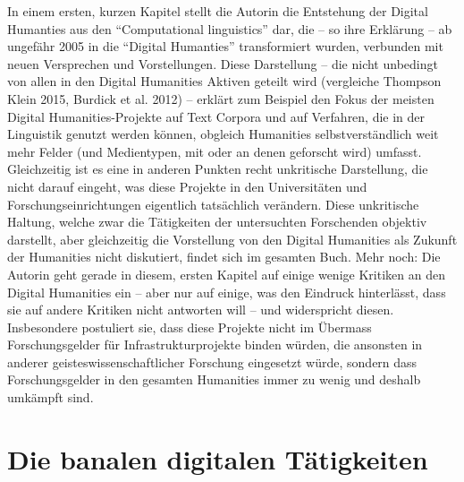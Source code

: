 \documentclass[a4paper,
fontsize=11pt,
oneside,
numbers=noperiodatend,
parskip=half-,
bibliography=totoc,
final
]{scrartcl}
\begin{document}
In einem ersten, kurzen Kapitel stellt die Autorin die Entstehung der
Digital Humanties aus den \enquote{Computational linguistics} dar, die
-- so ihre Erklärung -- ab ungefähr 2005 in die \enquote{Digital
Humanties} transformiert wurden, verbunden mit neuen Versprechen und
Vorstellungen. Diese Darstellung -- die nicht unbedingt von allen in den
Digital Humanities Aktiven geteilt wird (vergleiche Thompson Klein 2015,
Burdick et al. 2012) -- erklärt zum Beispiel den Fokus der meisten
Digital Humanities-Projekte auf Text Corpora und auf Verfahren, die in
der Linguistik genutzt werden können, obgleich Humanities
selbstverständlich weit mehr Felder (und Medientypen, mit oder an denen
geforscht wird) umfasst. Gleichzeitig ist es eine in anderen Punkten
recht unkritische Darstellung, die nicht darauf eingeht, was diese
Projekte in den Universitäten und Forschungseinrichtungen eigentlich
tatsächlich verändern. Diese unkritische Haltung, welche zwar die
Tätigkeiten der untersuchten Forschenden objektiv darstellt, aber
gleichzeitig die Vorstellung von den Digital Humanities als Zukunft der
Humanities nicht diskutiert, findet sich im gesamten Buch. Mehr noch:
Die Autorin geht gerade in diesem, ersten Kapitel auf einige wenige
Kritiken an den Digital Humanities ein -- aber nur auf einige, was den
Eindruck hinterlässt, dass sie auf andere Kritiken nicht antworten will
-- und widerspricht diesen. Insbesondere postuliert sie, dass diese
Projekte nicht im Übermass Forschungsgelder für Infrastrukturprojekte
binden würden, die ansonsten in anderer geisteswissenschaftlicher
Forschung eingesetzt würde, sondern dass Forschungsgelder in den
gesamten Humanities immer zu wenig und deshalb umkämpft sind.

\section*{Die banalen digitalen
Tätigkeiten}\label{die-banalen-digitalen-tuxe4tigkeiten}
\end{document}
